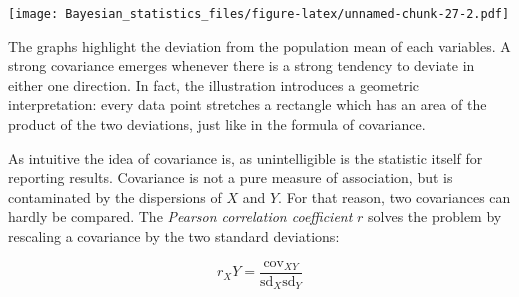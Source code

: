 \documentclass[]{svmono}
\newenvironment{Shaded}{\begin{snugshade}}{\end{snugshade}}
\newcommand{\KeywordTok}[1]{\textcolor[rgb]{0.13,0.29,0.53}{\textbf{#1}}}
\newcommand{\DataTypeTok}[1]{\textcolor[rgb]{0.13,0.29,0.53}{#1}}
\newcommand{\DecValTok}[1]{\textcolor[rgb]{0.00,0.00,0.81}{#1}}
\newcommand{\StringTok}[1]{\textcolor[rgb]{0.31,0.60,0.02}{#1}}
\newcommand{\ControlFlowTok}[1]{\textcolor[rgb]{0.13,0.29,0.53}{\textbf{#1}}}
\newcommand{\OperatorTok}[1]{\textcolor[rgb]{0.81,0.36,0.00}{\textbf{#1}}}
\newcommand{\NormalTok}[1]{#1}
\theoremstyle{definition}
\theoremstyle{definition}
\theoremstyle{definition}
\theoremstyle{remark}
\begin{document}
\begin{Shaded}
\end{Shaded}

\texttt{[image: Bayesian\_statistics\_files/figure-latex/unnamed-chunk-27-2.pdf]}

The graphs highlight the deviation from the population mean of each
variables. A strong covariance emerges whenever there is a strong
tendency to deviate in either one direction. In fact, the illustration
introduces a geometric interpretation: every data point stretches a
rectangle which has an area of the product of the two deviations, just
like in the formula of covariance.

As intuitive the idea of covariance is, as unintelligible is the
statistic itself for reporting results. Covariance is not a pure measure
of association, but is contaminated by the dispersions of \(X\) and
\(Y\). For that reason, two covariances can hardly be compared. The
\emph{Pearson correlation coefficient} \(r\) solves the problem by
rescaling a covariance by the two standard deviations:

\[
r_XY = \frac{\textrm{cov}_{XY}}{\textrm{sd}_X \textrm{sd}_Y}
\]

\begin{Shaded}
\end{Shaded}
\end{document}
